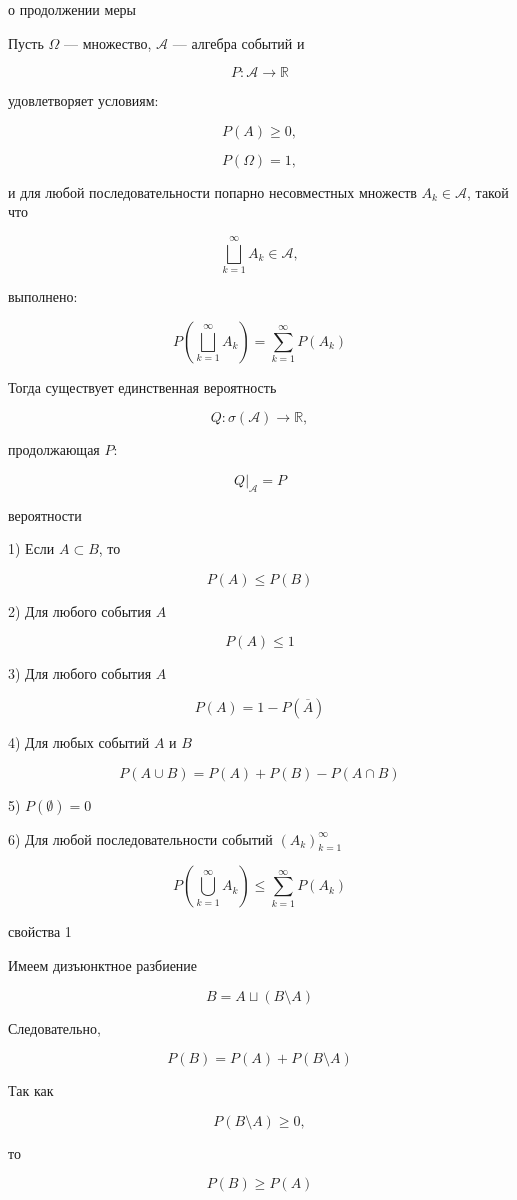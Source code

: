 \documentclass[12pt,a4paper]{article}
\begin{document}
\begin{theorem}{о продолжении меры}

Пусть $\Omega$ — множество, $\mathcal{A}$ — алгебра событий и

\[
P:\mathcal{A}\to\mathbb{R}
\]

удовлетворяет условиям:

\[
P(A)\geq0,
\]

\[
P(\Omega)=1,
\]

и для любой последовательности попарно несовместных множеств $A_k\in\mathcal{A}$, такой что

\[
\bigsqcup_{k=1}^{\infty}A_k\in\mathcal{A},
\]

выполнено:

\[
P\left(
\bigsqcup_{k=1}^{\infty}A_k
\right)
=
\sum_{k=1}^{\infty}P(A_k)
\]

Тогда существует единственная вероятность

\[
Q:\sigma(\mathcal{A})\to\mathbb{R},
\]

продолжающая $P$:

\[
Q|_{\mathcal{A}}=P
\]

\end{theorem}


\begin{props}{вероятности}

1) Если $A\subset B$, то

\[
P(A)\leq P(B)
\]


2) Для любого события $A$

\[
P(A)\leq1
\]


3) Для любого события $A$

\[
P(A)=1-P(\overline{A})
\]


4) Для любых событий $A$ и $B$

\[
P(A\cup B)
=
P(A)+P(B)-P(A\cap B)
\]


5) $P(\emptyset)=0$



6) Для любой последовательности событий $(A_k)_{k=1}^{\infty}$

\[
P\left(
\bigcup_{k=1}^{\infty}A_k
\right)
\leq
\sum_{k=1}^{\infty}P(A_k)
\]

\end{props}

\begin{proofbox}{свойства 1}

Имеем дизъюнктное разбиение

\[
B=A\sqcup(B\setminus A)
\]

Следовательно,

\[
P(B)
=
P(A)+P(B\setminus A)
\]

Так как

\[
P(B\setminus A)\geq0,
\]

то

\[
P(B)\geq P(A)
\]

\end{proofbox}
\end{document}

